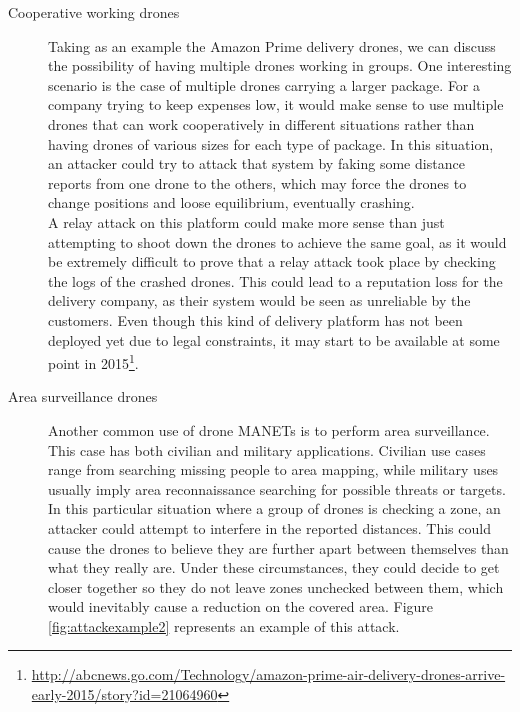 \documentclass{article}
\begin{document}
\begin{description}
  \item[Cooperative working drones] Taking as an example the Amazon Prime delivery drones, we can discuss the possibility of having multiple drones working in groups. One interesting scenario is the case of multiple drones carrying a larger package. For a company trying to keep expenses low, it would make sense to use multiple drones that can work cooperatively in different situations rather than having drones of various sizes for each type of package. In this situation, an attacker could try to attack that system by faking some distance reports from one drone to the others, which may force the drones to change positions and loose equilibrium, eventually crashing.\\
 
  A relay attack on this platform could make more sense than just attempting to shoot down the drones to achieve the same goal, as it would be extremely difficult to prove that a relay attack took place by checking the logs of the crashed drones. This could lead to a reputation loss for the delivery company, as their system would be seen as unreliable by the customers. Even though this kind of delivery platform has not been deployed yet due to legal constraints, it may start to be available at some point in 2015\footnote{\url{http://abcnews.go.com/Technology/amazon-prime-air-delivery-drones-arrive-early-2015/story?id=21064960}}.\\
  
  
  \item[Area surveillance drones] Another common use of drone MANETs is to perform area surveillance. This case has both civilian and military applications. Civilian use cases range from searching missing people to area mapping, while military uses usually imply area reconnaissance searching for possible threats or targets.\\
  
  In this particular situation where a group of drones is checking a zone, an attacker could attempt to interfere in the reported distances. This could cause the drones to believe they are further apart between themselves than what they really are. Under these circumstances, they could decide to get closer together so they do not leave zones unchecked between them, which would inevitably cause a reduction on the covered area. Figure \ref{fig:attackexample2} represents an example of this attack.\\
  

\end{description}
\end{document}
